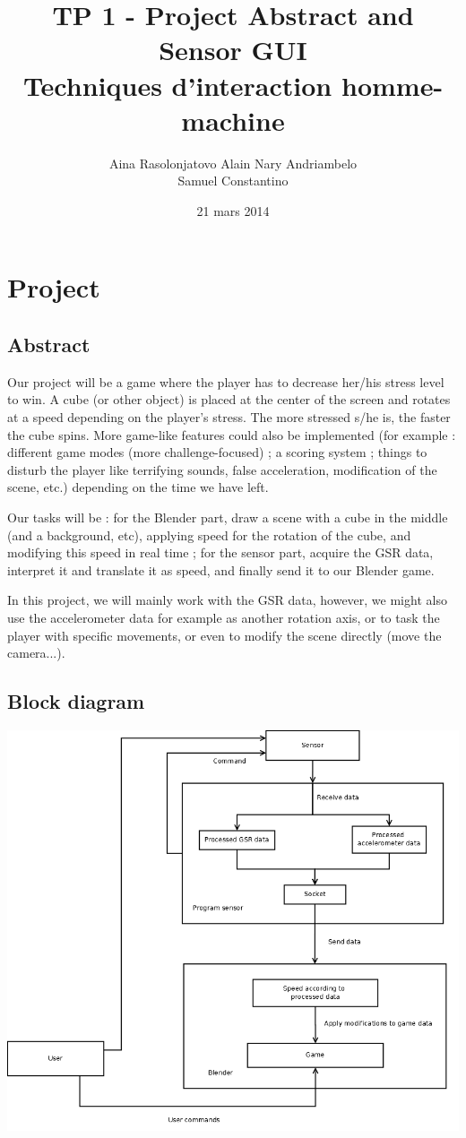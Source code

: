 \documentclass[12pt,a4paper]{article}
\title{\LARGE \textbf{TP 1 - Project Abstract and Sensor GUI}\\
	\bigskip
	\bigskip
	\large Techniques d'interaction homme-machine}
\author{Aina Rasolonjatovo Alain Nary Andriambelo \\ Samuel Constantino}
\date{21 mars 2014}
\begin{document}
	\maketitle


\section{Project}

\subsection{Abstract}

Our project will be a game where the player has to decrease her/his stress level to win. A cube (or other object) is placed at the center of the screen and rotates at a speed depending on the player's stress. The more stressed s/he is, the faster the cube spins. More game-like features could also be implemented (for example : different game modes (more challenge-focused) ; a scoring system ; things to disturb the player like terrifying sounds, false acceleration, modification of the scene, etc.) depending on the time we have left.

Our tasks will be : for the Blender part, draw a scene with a cube in the middle (and a background, etc), applying speed for the rotation of the cube, and modifying this speed in real time ; for the sensor part, acquire the GSR data, interpret it and translate it as speed, and finally send it to our Blender game. 

In this project, we will mainly work with the GSR data, however, we might also use the accelerometer data for example as another rotation axis, or to task the player with specific movements, or even to modify the scene directly (move the camera...).

\subsection{Block diagram}

\includegraphics[width=\textwidth,height=\textheight,keepaspectratio]{graph/blockDiagram.png}
\end{document}

